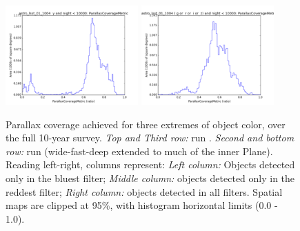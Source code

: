 \begin{figure}[ht]
\begin{center}
  \includegraphics[width=2.0in]{./figs/milkyway/astromPanels/MW_Astrom_paCovge_wfdPlane_y_hst.png}
  \includegraphics[width=2.0in]{./figs/milkyway/astromPanels/MW_Astrom_paCovge_wfdPlane_10y_hst.png}
  \end{center}
  \caption{Parallax coverage achieved for three extremes of object color, over the full 10-year survey. {\it Top and Third row:} \OpSim run . {\it Second and bottom row:} \OpSim run  (wide-fast-deep extended to much of the inner Plane). Reading left-right, columns represent: {\it Left column:} Objects detected only in the bluest filter; {\it Middle column:} objects detected only in the reddest filter; {\it Right column:} objects detected in all filters. Spatial maps are clipped at 95\%, with histogram horizontal limits (0.0 - 1.0).}
  \label{fig_astrom_ByFilter_PACoverage}
\end{figure}

